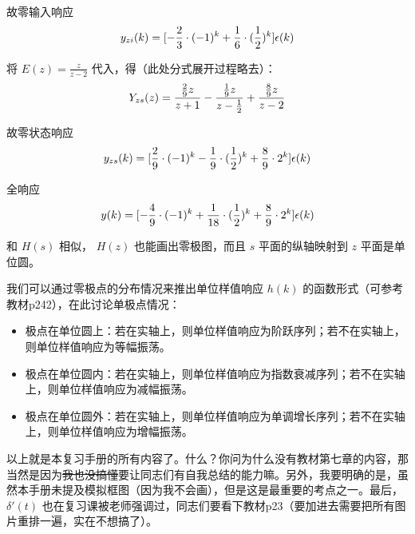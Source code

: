\documentclass[UTF8,a4paper,11pt]{article}
\begin{document}
故零输入响应
\begin{equation}
y_{zi}(k)=[-\frac{2}{3}\cdot(-1)^k+\frac{1}{6}\cdot(\frac{1}{2})^k]\epsilon(k)
\notag
\end{equation}

将 $E(z)=\frac{z}{z-2}$ 代入，得（此处分式展开过程略去）：
\begin{equation}
Y_{zs}(z)=\frac{\frac{2}{9}z}{z+1}-\frac{\frac{1}{9}z}{z-\frac{1}{2}}+\frac{\frac{8}{9}z}{z-2}
\notag
\end{equation}

故零状态响应
\begin{equation}
y_{zs}(k)=[\frac{2}{9}\cdot(-1)^k-\frac{1}{9}\cdot(\frac{1}{2})^k+\frac{8}{9}\cdot2^k]\epsilon(k)
\notag
\end{equation}

全响应
\begin{equation}
y(k)=[-\frac{4}{9}\cdot(-1)^k+\frac{1}{18}\cdot(\frac{1}{2})^k+\frac{8}{9}\cdot2^k]\epsilon(k)
\notag
\end{equation}

和 $H(s)$ 相似， $H(z)$ 也能画出零极图，而且 $s$ 平面的纵轴映射到 $z$ 平面是单位圆。

我们可以通过零极点的分布情况来推出单位样值响应 $h(k)$ 的函数形式（可参考教材p242），在此讨论单极点情况：
\begin{itemize}
\item 极点在单位圆上：若在实轴上，则单位样值响应为阶跃序列；若不在实轴上，则单位样值响应为等幅振荡。
\item 极点在单位圆内：若在实轴上，则单位样值响应为指数衰减序列；若不在实轴上，则单位样值响应为减幅振荡。
\item 极点在单位圆外：若在实轴上，则单位样值响应为单调增长序列；若不在实轴上，则单位样值响应为增幅振荡。
\end{itemize} 

以上就是本复习手册的所有内容了。什么？你问为什么没有教材第七章的内容，那当然是因为\sout{我也没搞懂}要让同志们有自我总结的能力嘛。另外，我要明确的是，虽然本手册未提及模拟框图（因为我不会画），但是这是最重要的考点之一。最后， $\delta'(t)$ 也在复习课被老师强调过，同志们要看下教材p23（要加进去需要把所有图片重排一遍，实在不想搞了）。
\end{document}

